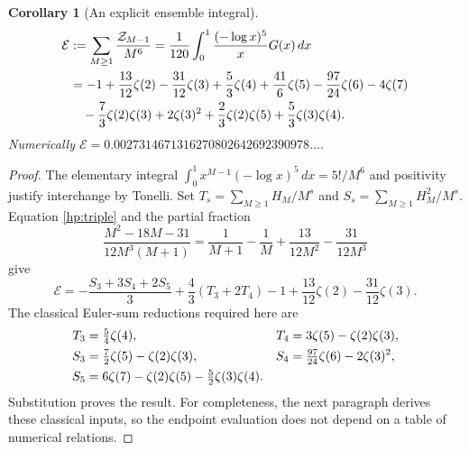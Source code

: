 \documentclass[11pt,a4paper]{article}
\newtheorem{corollary}[theorem]{Corollary}
\theoremstyle{definition}
\theoremstyle{remark}
\numberwithin{equation}{section}
\begin{document}
\begin{corollary}[An explicit ensemble integral]\label{hp:endpoint}
\begin{align}
 \mathcal E
 &:=\sum_{M\ge1}\frac{\mathcal Z_{M-1}}{M^6}
   =\frac1{120}\int_0^1\frac{(-\log x)^5}{x}G(x)\,dx
       \notag\\
 &=-1+\frac{13}{12}\zeta(2)-\frac{31}{12}\zeta(3)
       +\frac53\zeta(4)+\frac{41}{6}\zeta(5)
       -\frac{97}{24}\zeta(6)-4\zeta(7)\notag\\
 &\hspace{1em}-\frac73\zeta(2)\zeta(3)+2\zeta(3)^2
       +\frac23\zeta(2)\zeta(5)+\frac53\zeta(3)\zeta(4).
 \label{hp:endpoint-value}
\end{align}
Numerically $\mathcal E=0.0027314671316270802642692390978\ldots$.
\end{corollary}
\begin{proof}
The elementary integral
$\int_0^1x^{M-1}(-\log x)^5\,dx=5!/M^6$ and positivity
justify interchange by Tonelli. Set
$T_s=\sum_{M\ge1}H_M/M^s$ and
$S_s=\sum_{M\ge1}H_M^2/M^s$. Equation \eqref{hp:triple}
and the partial fraction
\[
 \frac{M^2-18M-31}{12M^3(M+1)}
 =\frac1{M+1}-\frac1M+\frac{13}{12M^2}-\frac{31}{12M^3}
\]
give
\begin{equation}\label{hp:euler-reduction}
 \mathcal E=-\frac{S_3+3S_4+2S_5}{3}
         +\frac43(T_3+2T_4)
         -1+\frac{13}{12}\zeta(2)-\frac{31}{12}\zeta(3).
\end{equation}
The classical Euler-sum reductions required here are
\begin{align}
 T_3&=\tfrac54\zeta(4),&
 T_4&=3\zeta(5)-\zeta(2)\zeta(3),\notag\\
 S_3&=\tfrac72\zeta(5)-\zeta(2)\zeta(3),&
 S_4&=\tfrac{97}{24}\zeta(6)-2\zeta(3)^2,\notag\\
 S_5&=6\zeta(7)-\zeta(2)\zeta(5)
                         -\tfrac52\zeta(3)\zeta(4).
 \label{hp:euler-values}
\end{align}
Substitution proves the result. For completeness, the next
paragraph derives these classical inputs, so the endpoint
evaluation does not depend on a table of numerical relations.
\end{proof}
\end{document}

